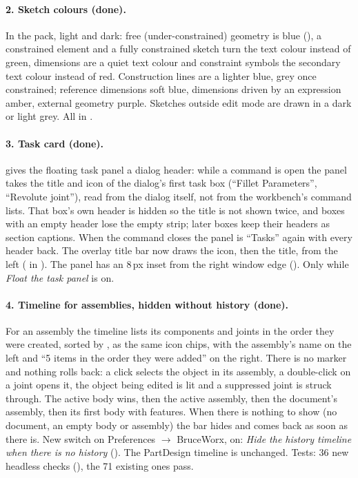 \paragraph{2. Sketch colours (done).} In the pack, light and dark: free (under-constrained) geometry is blue
(), a constrained element and a fully constrained sketch turn the text colour instead of
green, dimensions are a quiet text colour and constraint symbols the secondary text colour instead of red.
Construction lines are a lighter blue, grey once constrained; reference dimensions soft blue, dimensions driven by
an expression amber, external geometry purple. Sketches outside edit mode are drawn in a dark or light grey.
All in .

\paragraph{3. Task card (done).}  gives the floating task panel a dialog header:
while a command is open the panel takes the title and icon of the dialog's first task box (``Fillet
Parameters'', ``Revolute joint''), read from the dialog itself, not from the workbench's command lists. That
box's own header is hidden so the title is not shown twice, and boxes with an empty header lose the empty strip;
later boxes keep their headers as section captions. When the command closes the panel is ``Tasks'' again with
every header back. The overlay title bar now draws the icon, then the title, from the left (\code{[BW]} in
). The panel has an 8\,px inset from the right window edge ().
Only while \emph{Float the task panel} is on.

\paragraph{4. Timeline for assemblies, hidden without history (done).} For an assembly the timeline lists its
components and joints in the order they were created, sorted by , as the same icon chips, with the
assembly's name on the left and ``5 items in the order they were added'' on the right. There is no marker and
nothing rolls back: a click selects the object in its assembly, a double-click on a joint opens it, the object
being edited is lit and a suppressed joint is struck through. The active body wins, then the active assembly,
then the document's assembly, then its first body with features. When there is nothing to show (no document, an
empty body or assembly) the bar hides and comes back as soon as there is. New switch on Preferences
$\rightarrow$ BruceWorx, on: \emph{Hide the history timeline when there is no history}
(). The PartDesign timeline is unchanged. Tests: 36 new headless checks
(), the 71 existing ones pass.

